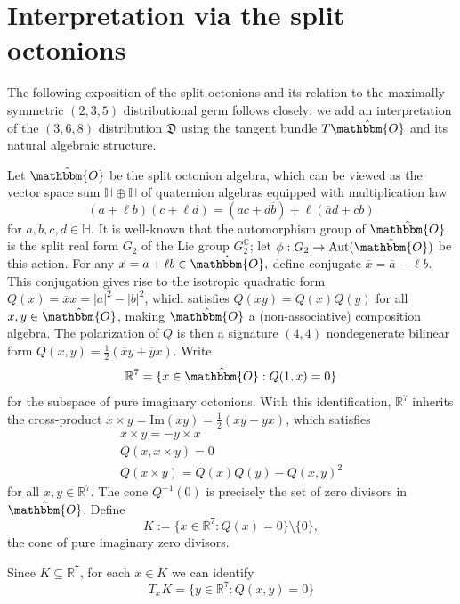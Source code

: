 \documentclass[11pt,letterpaper]{amsart}
\numberwithin{equation}{section}
\newcommand{\oline}{\overline}
\newcommand{\oct}{\hat{\mathbbm{O}}}
\begin{document}
\section{Interpretation via the split octonions}
\label{octonions_sec}
The following exposition of the split octonions and its relation to the maximally symmetric $(2,3,5)$ distributional germ follows \cite{AgrachevRollingBalls} closely; we add an interpretation of the $(3,6,8)$ distribution $\mathfrak{D}$ using the tangent bundle $T\oct$ and its natural algebraic structure.

Let $\oct$ be the split octonion algebra, which can be viewed as the vector space sum $\mathbb{H}\oplus\mathbb{H}$ of quaternion algebras equipped with multiplication law
\[
    (a+\ell b)(c + \ell d) = (ac + d\oline{b}) + \ell(\oline a d + cb)
\]
for $a,b,c,d\in \mathbb{H}$. It is well-known that the automorphism group of $\oct$ is the split real form $G_2$ of the Lie group $G_2^\mathbb C$; let $\phi:G_2\to \mathrm{Aut}(\oct)$ be this action. For any $x = a + \ell b\in\oct,$ define conjugate $\oline{x} = \oline{a} - \ell b$. This conjugation gives rise to the isotropic quadratic form $Q(x) = \oline{x}x = |a|^2-|b|^2$, which satisfies $Q(xy)=Q(x)Q(y)$ for all $x,y\in\oct$, making $\oct$ a (non-associative) composition algebra. The polarization of $Q$ is then a signature $(4,4)$ nondegenerate bilinear form $Q(x,y) = \frac{1}{2}(\oline xy+\oline yx)$. Write
\begin{equation}
    \mathbb R^7 = \{x\in \oct: Q(1,x)=0\}
\end{equation} for the subspace of pure imaginary octonions. With this identification, $\mathbb{R}^7$ inherits the cross-product $x\times y = \mathrm{Im}(xy) = \frac{1}{2}(xy-yx)$, which satisfies
\begin{gather}
    \label{cross prod antisymm}
    x \times y = -y\times x
    \\
    \label{cross prod orthogonality}
    Q(x, x\times y) = 0
    \\
    \label{cross prod magnitude}
    Q(x\times y) = Q(x)Q(y)-Q(x,y)^2
\end{gather}
for all $x,y\in \mathbb{R}^7$. The cone $Q^{-1}(0)$ is precisely the set of zero divisors in $\oct$. Define
\begin{equation}
    K:=\{x\in\mathbb{R}^7 : Q(x)=0\}\setminus\{0\},
\end{equation}
the cone of pure imaginary zero divisors.

Since $K\subseteq \mathbb R^7$, for each $x\in K$ we can identify
\begin{equation}
\label{TxK}
    T_xK = \{y\in \mathbb{R}^7: Q(x,y) = 0\}
\end{equation}
\end{document}
